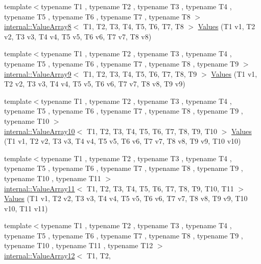 \begin{DoxyCompactItemize}
\item 
{\footnotesize template$<$typename T1 , typename T2 , typename T3 , typename T4 , typename T5 , typename T6 , typename T7 , typename T8 $>$ }\\\hyperlink{classtesting_1_1internal_1_1ValueArray8}{internal\-::\-Value\-Array8}$<$ \-T1, \-T2, \*
\-T3, \-T4, \-T5, \-T6, \-T7, \-T8 $>$ \hyperlink{namespacetesting_a1eda12e6518e4c51c1bb2e7cc9d31ffa}{\-Values} (\-T1 v1, \-T2 v2, \-T3 v3, \-T4 v4, \-T5 v5, \-T6 v6, \-T7 v7, \-T8 v8)
\item 
{\footnotesize template$<$typename T1 , typename T2 , typename T3 , typename T4 , typename T5 , typename T6 , typename T7 , typename T8 , typename T9 $>$ }\\\hyperlink{classtesting_1_1internal_1_1ValueArray9}{internal\-::\-Value\-Array9}$<$ \-T1, \-T2, \*
\-T3, \-T4, \-T5, \-T6, \-T7, \-T8, \-T9 $>$ \hyperlink{namespacetesting_ab663e13807ad5cc223814797c9191a58}{\-Values} (\-T1 v1, \-T2 v2, \-T3 v3, \-T4 v4, \-T5 v5, \-T6 v6, \-T7 v7, \-T8 v8, \-T9 v9)
\item 
{\footnotesize template$<$typename T1 , typename T2 , typename T3 , typename T4 , typename T5 , typename T6 , typename T7 , typename T8 , typename T9 , typename T10 $>$ }\\\hyperlink{classtesting_1_1internal_1_1ValueArray10}{internal\-::\-Value\-Array10}$<$ \-T1, \-T2, \*
\-T3, \-T4, \-T5, \-T6, \-T7, \-T8, \-T9, \*
\-T10 $>$ \hyperlink{namespacetesting_a2948b0215fce80155fdbad4e3608f4cd}{\-Values} (\-T1 v1, \-T2 v2, \-T3 v3, \-T4 v4, \-T5 v5, \-T6 v6, \-T7 v7, \-T8 v8, \-T9 v9, \-T10 v10)
\item 
{\footnotesize template$<$typename T1 , typename T2 , typename T3 , typename T4 , typename T5 , typename T6 , typename T7 , typename T8 , typename T9 , typename T10 , typename T11 $>$ }\\\hyperlink{classtesting_1_1internal_1_1ValueArray11}{internal\-::\-Value\-Array11}$<$ \-T1, \-T2, \*
\-T3, \-T4, \-T5, \-T6, \-T7, \-T8, \-T9, \*
\-T10, \-T11 $>$ \hyperlink{namespacetesting_a4aaae77b8404038ed5f3bf56cccdb940}{\-Values} (\-T1 v1, \-T2 v2, \-T3 v3, \-T4 v4, \-T5 v5, \-T6 v6, \-T7 v7, \-T8 v8, \-T9 v9, \-T10 v10, \-T11 v11)
\item 
{\footnotesize template$<$typename T1 , typename T2 , typename T3 , typename T4 , typename T5 , typename T6 , typename T7 , typename T8 , typename T9 , typename T10 , typename T11 , typename T12 $>$ }\\\hyperlink{classtesting_1_1internal_1_1ValueArray12}{internal\-::\-Value\-Array12}$<$ \-T1, \-T2, \*

\end{DoxyCompactItemize}
